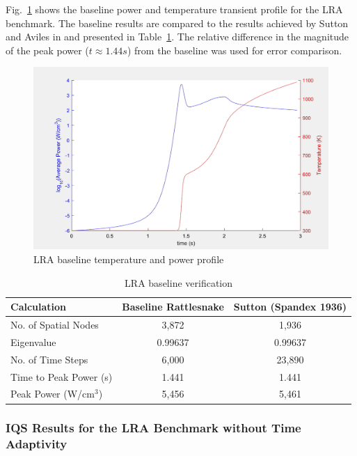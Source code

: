 \documentclass{elsarticle}
\newcommand{\fig}[1]{Fig.~\ref{#1}}                      %
\newcommand{\tbl}[1]{Table~\ref{#1}}                     %
\begin{document}
\fig{fig:lra_profile} shows the baseline power and temperature transient profile for the LRA benchmark. The baseline results are compared to the results achieved by Sutton and Aviles in \cite{Sutton_1996} and presented in \tbl{tab:base}.  The relative difference in the magnitude of the peak power ($t\approx1.44 s$) from the baseline was used for error comparison.  

\begin{figure}[htbp!]
\centering
\includegraphics[width=\linewidth]{figures/lra_profile.png}
\caption{LRA baseline temperature and power profile}
\label{fig:lra_profile}
\end{figure}

\begin{table}[!htbp]
\begin{center}
\caption{LRA baseline verification}
\label{tab:base}
\begin{tabular}{|l||c|c|}
\hline
Calculation   &  Baseline Rattlesnake & Sutton (Spandex 1936) \\
\hline\hline
No. of Spatial Nodes	& 3,872 		& 1,936 \\
Eigenvalue 				& 0.99637	& 0.99637 \\
No. of Time Steps 		& 6,000 		& 23,890 \\
Time to Peak Power (s) 	& 1.441 	& 1.441 \\
Peak Power (W/cm$^3$) 	& 5,456 		& 5,461 \\
\hline
\end{tabular}
\end{center}
\end{table}

\subsubsection{IQS Results for the LRA Benchmark without Time Adaptivity}
\end{document}
